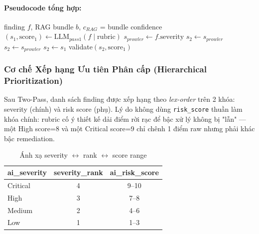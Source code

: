 \paragraph*{Pseudocode tổng hợp:}
\begin{algorithmic}[1]
  \Require finding $f$, RAG bundle $b$, $c_{RAG}$ = bundle confidence
  \State $(s_1, \text{score}_1) \gets \text{LLM}_{pass1}(f \mid \text{rubric})$ 
  \State $s_{prowler} \gets f.\text{severity}$
    \State $s_2 \gets s_{prowler}$ 
    \State $s_2 \gets s_{prowler}$ 
  \Else
    \State $s_2 \gets s_1$
  \EndIf
  \State \Return validate$(s_2, \text{score}_1)$ 
\end{algorithmic}

\subsubsection*{Cơ chế Xếp hạng Ưu tiên Phân cấp (Hierarchical Prioritization)}
Sau Two-Pass, danh sách finding được xếp hạng theo \textit{lex-order} trên 2 khóa: severity (chính) và risk score (phụ). Lý do không dùng \texttt{risk\_score} thuần làm khóa chính: rubric cố ý thiết kế dải điểm rời rạc để bậc xử lý không bị "lẫn" — một High score=8 và một Critical score=9 chỉ chênh 1 điểm raw nhưng phải khác bậc remediation.

\begin{table}[!htb]
  \centering
  \caption{Ánh xạ severity $\leftrightarrow$ rank $\leftrightarrow$ score range}
  \label{tab:severity_mapping}
  \renewcommand{\arraystretch}{1.15}
  \footnotesize
  \begin{tabular}{|l|c|c|}
    \hline
    \textbf{ai\_severity} & \textbf{severity\_rank} & \textbf{ai\_risk\_score} \\ \hline
    Critical & 4 & 9--10 \\ \hline
    High     & 3 & 7--8 \\ \hline
    Medium   & 2 & 4--6 \\ \hline
    Low      & 1 & 1--3 \\ \hline
  \end{tabular}
\end{table}

